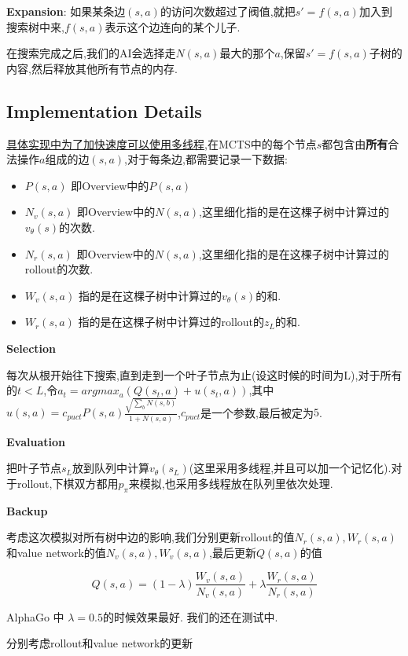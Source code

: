 \documentclass[twocolumn]{article}
\begin{document}
\noindent\textbf{Expansion}: 如果某条边$(s, a)$的访问次数超过了阀值,就把$s'= f(s,a)$加入到搜索树中来,$f(s,a)$表示这个边连向的某个儿子.

在搜索完成之后,我们的AI会选择走$N(s, a)$最大的那个$a$,保留$s'=f(s, a)$子树的内容,然后释放其他所有节点的内存.

\subsection{Implementation Details}

\underline{具体实现中为了加快速度可以使用多线程},在MCTS中的每个节点$s$都包含由\textbf{所有}合法操作$a$组成的边$(s,a)$,对于每条边,都需要记录一下数据:

\begin{itemize}
	\item $P(s, a)$ 即Overview中的$P(s, a)$
	\item $N_v(s, a)$ 即Overview中的$N(s, a)$,这里细化指的是在这棵子树中计算过的$v_\theta(s)$的次数.
	\item $N_r(s, a)$ 即Overview中的$N(s, a)$,这里细化指的是在这棵子树中计算过的rollout的次数.
	\item $W_v(s, a)$ 指的是在这棵子树中计算过的$v_\theta(s)$的和.
	\item $W_r(s, a)$ 指的是在这棵子树中计算过的rollout的$z_L$的和.
\end{itemize}

\noindent\textbf{Selection}

每次从根开始往下搜索,直到走到一个叶子节点为止(设这时候的时间为L),对于所有的$t < L$,令$a_t = argmax_a(Q(s_t, a) + u(s_t, a))$,其中$u(s, a) = c_{puct}P(s, a)\frac{\sqrt{\sum_{b}N(s,b)}}{1+N(s,a)}$,$c_{puct}$是一个参数,最后被定为$5$.

\noindent\textbf{Evaluation}

把叶子节点$s_L$放到队列中计算$v_\theta(s_L)$(这里采用多线程,并且可以加一个记忆化).对于rollout,下棋双方都用$p_\pi$来模拟,也采用多线程放在队列里依次处理.

\noindent\textbf{Backup}

考虑这次模拟对所有树中边的影响,我们分别更新rollout的值$N_r(s, a), W_r(s, a)$和value network的值$N_v(s, a), W_v(s, a)$,最后更新$Q(s, a)$的值

\[
Q(s, a) = (1 - \lambda)\frac{W_v(s,a)}{N_v(s,a)}+\lambda\frac{W_r(s,a)}{N_r(s,a)}
\]

AlphaGo 中 $\lambda=0.5$的时候效果最好. \textcolor[rgb]{1,0,0}{我们的还在测试中.}

分别考虑rollout和value network的更新
\end{document}

